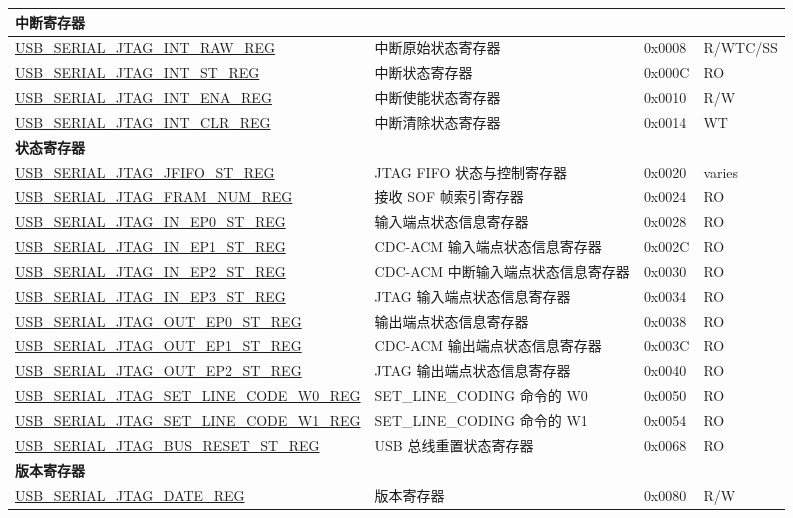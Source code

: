 \begin{longtable}{ | p{7.4cm} | p{5.2cm} | p{1.2cm} | p{1.7cm} | }
    \multicolumn{4}{|l|}{\textbf{中断寄存器}} \\ \hline
    \hyperref[regdesc:USBSERIALJTAGINTRAWREG]{USB\_SERIAL\_JTAG\_INT\_RAW\_REG} & 中断原始状态寄存器 & 0x0008 & R/WTC/SS \\ \hline
    \hyperref[regdesc:USBSERIALJTAGINTSTREG]{USB\_SERIAL\_JTAG\_INT\_ST\_REG} & 中断状态寄存器 & 0x000C & RO \\ \hline
    \hyperref[regdesc:USBSERIALJTAGINTENAREG]{USB\_SERIAL\_JTAG\_INT\_ENA\_REG} & 中断使能状态寄存器 & 0x0010 & R/W \\ \hline
    \hyperref[regdesc:USBSERIALJTAGINTCLRREG]{USB\_SERIAL\_JTAG\_INT\_CLR\_REG} & 中断清除状态寄存器 & 0x0014 & WT \\ \hline
    \multicolumn{4}{|l|}{\textbf{状态寄存器}} \\ \hline
    \hyperref[regdesc:USBSERIALJTAGJFIFOSTREG]{USB\_SERIAL\_JTAG\_JFIFO\_ST\_REG} & JTAG FIFO 状态与控制寄存器 & 0x0020 & varies \\ \hline
    \hyperref[regdesc:USBSERIALJTAGFRAMNUMREG]{USB\_SERIAL\_JTAG\_FRAM\_NUM\_REG} & 接收 SOF 帧索引寄存器 & 0x0024 & RO \\ \hline
    \hyperref[regdesc:USBSERIALJTAGINEP0STREG]{USB\_SERIAL\_JTAG\_IN\_EP0\_ST\_REG} & 输入端点状态信息寄存器 & 0x0028 & RO \\ \hline
    \hyperref[regdesc:USBSERIALJTAGINEP1STREG]{USB\_SERIAL\_JTAG\_IN\_EP1\_ST\_REG} & CDC-ACM 输入端点状态信息寄存器 & 0x002C & RO \\ \hline
    \hyperref[regdesc:USBSERIALJTAGINEP2STREG]{USB\_SERIAL\_JTAG\_IN\_EP2\_ST\_REG} & CDC-ACM 中断输入端点状态信息寄存器 & 0x0030 & RO \\ \hline
    \hyperref[regdesc:USBSERIALJTAGINEP3STREG]{USB\_SERIAL\_JTAG\_IN\_EP3\_ST\_REG} & JTAG 输入端点状态信息寄存器 & 0x0034 & RO \\ \hline
    \hyperref[regdesc:USBSERIALJTAGOUTEP0STREG]{USB\_SERIAL\_JTAG\_OUT\_EP0\_ST\_REG} & 输出端点状态信息寄存器 & 0x0038 & RO \\ \hline
    \hyperref[regdesc:USBSERIALJTAGOUTEP1STREG]{USB\_SERIAL\_JTAG\_OUT\_EP1\_ST\_REG} & CDC-ACM 输出端点状态信息寄存器 & 0x003C & RO \\ \hline
    \hyperref[regdesc:USBSERIALJTAGOUTEP2STREG]{USB\_SERIAL\_JTAG\_OUT\_EP2\_ST\_REG} & JTAG 输出端点状态信息寄存器 & 0x0040 & RO \\ \hline
    \hyperref[regdesc:USBSERIALJTAGSETLINECODEW0REG]{USB\_SERIAL\_JTAG\_SET\_LINE\_CODE\_W0\_REG} & SET\_LINE\_CODING 命令的 W0 & 0x0050 & RO \\ \hline
    \hyperref[regdesc:USBSERIALJTAGSETLINECODEW1REG]{USB\_SERIAL\_JTAG\_SET\_LINE\_CODE\_W1\_REG} & SET\_LINE\_CODING 命令的 W1 & 0x0054 & RO \\ \hline
    \hyperref[regdesc:USBSERIALJTAGBUSRESETSTREG]{USB\_SERIAL\_JTAG\_BUS\_RESET\_ST\_REG} & USB 总线重置状态寄存器 & 0x0068 & RO \\ \hline
    \multicolumn{4}{|l|}{\textbf{版本寄存器}} \\ \hline
    \hyperref[regdesc:USBSERIALJTAGDATEREG]{USB\_SERIAL\_JTAG\_DATE\_REG} & 版本寄存器 & 0x0080 & R/W \\ \hline
    \end{longtable}

